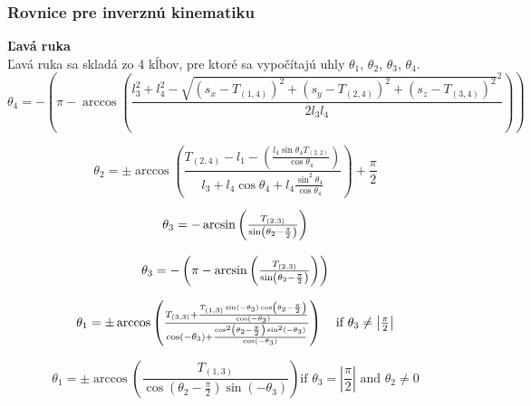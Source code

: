 \subsubsection{Rovnice pre inverznú kinematiku} \label{sec_inverse_kinematics_equations}
\textbf{Ľavá ruka}\\
Ľavá ruka sa skladá zo 4 kĺbov, pre ktoré sa vypočítajú uhly $\theta_1$, $\theta_2$, $\theta_3$, $\theta_4$.
\begin{equation}
	\theta_4 = -\left(\pi - \arccos\left(\frac{l_3^2 + l_4^2 - \sqrt{\left(s_x - T_{\left(1,4\right)}\right)^2 + \left(s_y - T_{\left(2,4\right)}\right)^2 + \left(s_z - T_{\left(3,4\right)}\right)^2}^2}{2l_3l_4}\right)\right)
\end{equation}

\begin{equation}
	\theta_2 = \pm \arccos{\left(\frac{T_{\left(2,4\right)}-l_1-\left(\frac{l_4 \sin{\theta_4}T_{\left(2,2\right)}}{\cos{\theta_4}}\right)}{l_3 + l_4\cos{\theta_4}+l_4\frac{\sin^2{\theta_4}}{\cos{\theta_4}}}\right)} + \frac{\pi}{2}
\end{equation}

\begin{equation}
	\begin{tabular}{c}
		$\theta_3 = -\arcsin\left(\frac{T_{\left(2,3\right)}}{\sin\left(\theta_2 - \frac{\pi}{2}\right)}\right)$ \\\\
		$\theta_3 = -\left(\pi - \arcsin\left(\frac{T_{\left(2,3\right)}}{\sin\left(\theta_2 - \frac{\pi}{2}\right)}\right)\right)$
	\end{tabular}
\end{equation}

\begin{equation}
	\begin{tabular}{lr}
		$\theta_1=\pm \arccos\left(\frac{T_{\left(3,3\right)} + \frac{T_{\left(1,3\right)}\sin\left(-\theta_3\right)\cos\left(\theta_2 - \frac{\pi}{2}\right)}{\cos\left(-\theta_3\right)}}{\cos\left(-\theta_3\right) + \frac{\cos^2\left(\theta_2 - \frac{\pi}{2}\right) \sin^2\left(-\theta_3\right)}{\cos\left(-\theta_3\right)}}\right)$ & 
	$\text{if }\theta_3 \neq \left|\frac{\pi}{2}\right|$
	\end{tabular}
\end{equation}

\begin{equation}
	\theta_1 = \pm \arccos\left(\frac{T_{\left(1,3\right)}}{\cos\left(\theta_2 - \frac{\pi}{2}\right) \sin\left(-\theta_3\right)}\right)
	\text{if }\theta_3 = \left|\frac{\pi}{2}\right|\text{ and }\theta_2 \neq 0
\end{equation}

